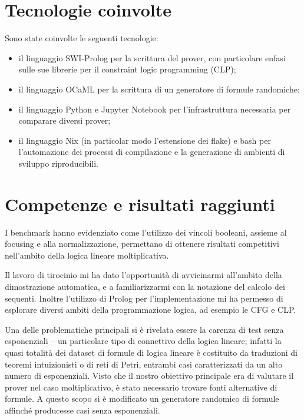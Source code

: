\documentclass[a4paper, 12pt, italian]{article}
\begin{document}
\section{Tecnologie coinvolte}
Sono state coinvolte le seguenti tecnologie:
\begin{itemize}
	\item il linguaggio SWI-Prolog per la scrittura del prover, con particolare enfasi sulle sue librerie per il constraint logic programming (CLP);
	\item il linguaggio OCaML per la scrittura di un generatore di formule randomiche;
	\item il linguaggio Python e Jupyter Notebook per l'infrastruttura necessaria per comparare diversi prover;
	\item il linguaggio Nix (in particolar modo l'estensione dei flake) e bash per l'automazione dei processi di compilazione e la generazione di ambienti di sviluppo riproducibili.
\end{itemize}

\section{Competenze e risultati raggiunti}
I benchmark hanno evidenziato come l'utilizzo dei vincoli booleani, assieme al focusing e alla normalizzazione, permettano di ottenere risultati competitivi nell’ambito della logica lineare moltiplicativa.

Il lavoro di tirocinio mi ha dato l'opportunità di avvicinarmi all’ambito della dimostrazione automatica, e a familiarizzarmi con la notazione del calcolo dei sequenti.
Inoltre l’utilizzo di Prolog per l'implementazione mi ha permesso di esplorare diversi ambiti della programmazione logica, ad esempio le CFG e CLP.

Una delle problematiche principali si è rivelata essere la carenza di test senza esponenziali -- un particolare tipo di connettivo della logica lineare; infatti la quasi totalità dei dataset di formule di logica lineare è costituito da traduzioni di teoremi intuizionisti o di reti di Petri, entrambi casi caratterizzati da un alto numero di esponenziali.
Visto che il nostro obiettivo principale era di valutare il prover nel caso moltiplicativo, è stato necessario trovare fonti alternative di formule.
A questo scopo si è modificato un generatore randomico di formule affinché producesse casi senza esponenziali.

\newpage


\end{document}
